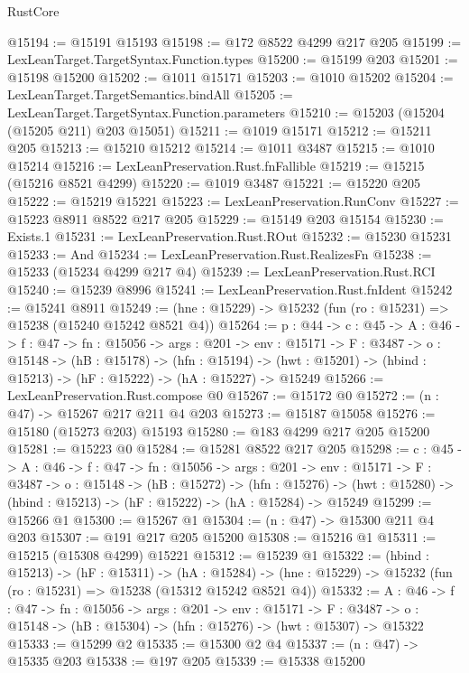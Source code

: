 \begin{lexlean}{RustCore}
\begin{coremodule}
@15194 := @15191 @15193
@15198 := @172 @8522 @4299 @217 @205
@15199 := LexLeanTarget.TargetSyntax.Function.types
@15200 := @15199 @203
@15201 := @15198 @15200
@15202 := @1011 @15171
@15203 := @1010 @15202
@15204 := LexLeanTarget.TargetSemantics.bindAll
@15205 := LexLeanTarget.TargetSyntax.Function.parameters
@15210 := @15203 (@15204 (@15205 @211) @203 @15051)
@15211 := @1019 @15171
@15212 := @15211 @205
@15213 := @15210 @15212
@15214 := @1011 @3487
@15215 := @1010 @15214
@15216 := LexLeanPreservation.Rust.fnFallible
@15219 := @15215 (@15216 @8521 @4299)
@15220 := @1019 @3487
@15221 := @15220 @205
@15222 := @15219 @15221
@15223 := LexLeanPreservation.RunConv
@15227 := @15223 @8911 @8522 @217 @205
@15229 := @15149 @203 @15154
@15230 := Exists.{1}
@15231 := LexLeanPreservation.Rust.ROut
@15232 := @15230 @15231
@15233 := And
@15234 := LexLeanPreservation.Rust.RealizesFn
@15238 := @15233 (@15234 @4299 @217 @4)
@15239 := LexLeanPreservation.Rust.RCI
@15240 := @15239 @8996
@15241 := LexLeanPreservation.Rust.fnIdent
@15242 := @15241 @8911
@15249 := (hne : @15229) -> @15232 (fun (ro : @15231) => @15238 (@15240 @15242 @8521 @4))
@15264 := {p : @44} ->
  {c : @45} ->
  {A : @46} ->
  {f : @47} ->
  {fn : @15056} ->
  {args : @201} ->
  {env : @15171} ->
  {F : @3487} ->
  {o : @15148} ->
  (hB : @15178) ->
  (hfn : @15194) -> (hwt : @15201) -> (hbind : @15213) -> (hF : @15222) -> (hA : @15227) -> @15249
@15266 := LexLeanPreservation.Rust.compose @0
@15267 := @15172 @0
@15272 := (n : @47) -> @15267 @217 @211 @4 @203
@15273 := @15187 @15058
@15276 := @15180 (@15273 @203) @15193
@15280 := @183 @4299 @217 @205 @15200
@15281 := @15223 @0
@15284 := @15281 @8522 @217 @205
@15298 := {c : @45} ->
  {A : @46} ->
  {f : @47} ->
  {fn : @15056} ->
  {args : @201} ->
  {env : @15171} ->
  {F : @3487} ->
  {o : @15148} ->
  (hB : @15272) ->
  (hfn : @15276) -> (hwt : @15280) -> (hbind : @15213) -> (hF : @15222) -> (hA : @15284) -> @15249
@15299 := @15266 @1
@15300 := @15267 @1
@15304 := (n : @47) -> @15300 @211 @4 @203
@15307 := @191 @217 @205 @15200
@15308 := @15216 @1
@15311 := @15215 (@15308 @4299) @15221
@15312 := @15239 @1
@15322 := (hbind : @15213) ->
  (hF : @15311) ->
  (hA : @15284) -> (hne : @15229) -> @15232 (fun (ro : @15231) => @15238 (@15312 @15242 @8521 @4))
@15332 := {A : @46} ->
  {f : @47} ->
  {fn : @15056} ->
  {args : @201} ->
  {env : @15171} ->
  {F : @3487} -> {o : @15148} -> (hB : @15304) -> (hfn : @15276) -> (hwt : @15307) -> @15322
@15333 := @15299 @2
@15335 := @15300 @2 @4
@15337 := (n : @47) -> @15335 @203
@15338 := @197 @205
@15339 := @15338 @15200

\end{coremodule}
\end{lexlean}
